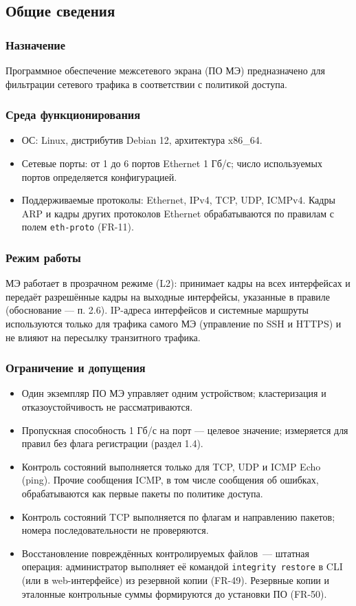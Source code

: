 \documentclass[13pt,a4paper,final]{article}
\begin{document}
	\subsection{Общие сведения}
	\subsubsection{Назначение}
	Программное обеспечение межсетевого экрана (ПО МЭ) предназначено для фильтрации сетевого трафика в соответствии с политикой доступа. 
	\subsubsection{Среда функционирования}
	\begin{itemize}
		\item ОС: Linux, дистрибутив Debian 12, архитектура x86\_64.
		\item Сетевые порты: от 1 до 6 портов Ethernet 1 Гб/с; число используемых портов определяется конфигурацией.
		\item Поддерживаемые протоколы: Ethernet, IPv4, TCP, UDP, ICMPv4.  Кадры ARP и кадры других протоколов Ethernet обрабатываются по правилам с полем \texttt{eth-proto} (FR-11).
	\end{itemize}
	
	\subsubsection{Режим работы}
	МЭ работает в прозрачном режиме (L2): принимает кадры на всех интерфейсах и передаёт разрешённые кадры на выходные интерфейсы, указанные в правиле (обоснование — п. 2.6). IP-адреса интерфейсов и системные маршруты используются только для трафика самого МЭ (управление по SSH и HTTPS) и не влияют на пересылку транзитного трафика.
	
	\subsubsection{Ограничение и допущения}
	\begin{itemize}
		\item Один экземпляр ПО МЭ управляет одним устройством; кластеризация и отказоустойчивость не рассматриваются.
		\item Пропускная способность 1 Гб/с на порт — целевое значение; измеряется для правил без флага регистрации (раздел 1.4).
		\item Контроль состояний выполняется только для TCP, UDP и ICMP Echo (ping). Прочие сообщения ICMP, в том числе сообщения об ошибках, обрабатываются как первые пакеты по политике доступа.
		\item Контроль состояний TCP выполняется по флагам и направлению пакетов; номера последовательности не проверяются.
		\item Восстановление повреждённых контролируемых файлов~--- штатная операция: администратор выполняет её командой \texttt{integrity restore} в CLI (или в web-интерфейсе) из резервной копии (FR-49). Резервные копии и эталонные контрольные суммы формируются до установки ПО (FR-50).
	\end{itemize}
	
\end{document}
